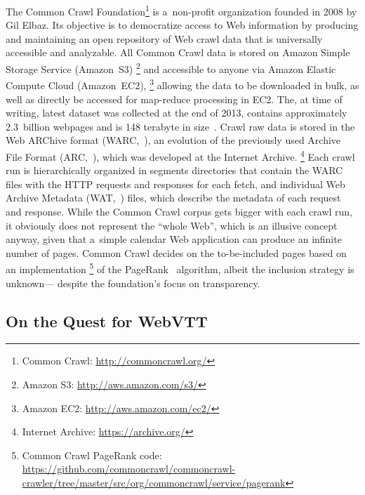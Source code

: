 \documentclass{sig-alternate}
\newcommand{\inlinelistingsize}{\fontsize{8pt}{11pt}}
\let\oldurl\url
\renewcommand{\url}[1]{\inlinelistingsize\oldurl{#1}}
\begin{document}
The Common Crawl Foundation\footnote{Common Crawl: \url{http://commoncrawl.org/}}
is a~non-profit organization founded in 2008 by Gil Elbaz.
Its objective is to democratize access to Web information
by producing and maintaining an open repository of Web crawl data
that is universally accessible and analyzable.
All Common Crawl data is stored on Amazon Simple Storage Service (Amazon~S3)%
\footnote{Amazon S3: \url{http://aws.amazon.com/s3/}} and
accessible to anyone via Amazon Elastic Compute Cloud (Amazon~EC2),%
\footnote{Amazon EC2: \url{http://aws.amazon.com/ec2/}}
allowing the data to be downloaded in bulk,
as well as directly be accessed for map-reduce processing in EC2.
The, at time of writing, latest dataset was collected at the end of 2013,
contains approximately 2.3~billion webpages
and is 148 terabyte in size~\cite{green2014winter}.
Crawl raw data is stored in the Web ARChive format
(WARC,~\cite{iso285002008warc}), an evolution of the previously used
Archive File Format (ARC,~\cite{burner1996arc}),
which was developed at the Internet Archive.%
\footnote{Internet Archive: \url{https://archive.org/}}
Each crawl run is hierarchically organized in segments directories
that contain the WARC files with the HTTP requests and responses for each fetch,
and individual Web Archive Metadata (WAT,~\cite{goel2011wat}) files,
which describe the metadata of each request and response.
While the Common Crawl corpus gets bigger with each crawl run,
it obviously does not represent the ``whole Web'',
which is an illusive concept anyway,
given that a~simple calendar Web application can produce an infinite number of pages.
Common Crawl decides on the to-be-included pages based on an implementation%
\footnote{Common Crawl PageRank code:
\url{https://github.com/commoncrawl/commoncrawl-crawler/tree/master/src/org/commoncrawl/service/pagerank}}
of the PageRank~\cite{page1999pagerank} algorithm,
albeit the inclusion strategy is unknown---%
despite the foundation's focus on transparency.

\subsection{On the Quest for WebVTT}
\end{document}
